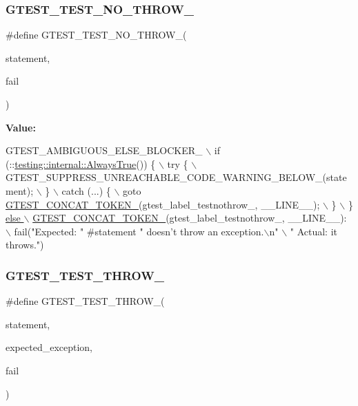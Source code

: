 \subsubsection{\texorpdfstring{G\+T\+E\+S\+T\+\_\+\+T\+E\+S\+T\+\_\+\+N\+O\+\_\+\+T\+H\+R\+O\+W\+\_\+}{GTEST\_TEST\_NO\_THROW\_}}
{\footnotesize\ttfamily \#define G\+T\+E\+S\+T\+\_\+\+T\+E\+S\+T\+\_\+\+N\+O\+\_\+\+T\+H\+R\+O\+W\+\_\+(\begin{DoxyParamCaption}\item[{}]{statement,  }\item[{}]{fail }\end{DoxyParamCaption})}

{\bfseries Value\+:}
\begin{DoxyCode}
GTEST\_AMBIGUOUS\_ELSE\_BLOCKER\_ \(\backslash\)
  if (::\hyperlink{namespacetesting_1_1internal_a4d46f09c3bfe68700b7f728d2cc3782f}{testing::internal::AlwaysTrue}()) \{ \(\backslash\)
    try \{ \(\backslash\)
      GTEST\_SUPPRESS\_UNREACHABLE\_CODE\_WARNING\_BELOW\_(statement); \(\backslash\)
    \} \(\backslash\)
    catch (...) \{ \(\backslash\)
      goto \hyperlink{gtest-internal_8h_ae3c336cbe1ae2bd1b1d019333e4428a0}{GTEST\_CONCAT\_TOKEN\_}(gtest\_label\_testnothrow\_, \_\_LINE\_\_); \(\backslash\)
    \} \(\backslash\)
  \} \hyperlink{gtest-internal_8h_ae3c336cbe1ae2bd1b1d019333e4428a0}{else \(\backslash\)}
\hyperlink{gtest-internal_8h_ae3c336cbe1ae2bd1b1d019333e4428a0}{    GTEST\_CONCAT\_TOKEN\_}(gtest\_label\_testnothrow\_, \_\_LINE\_\_): \(\backslash\)
      fail(\textcolor{stringliteral}{"Expected: "} #statement \textcolor{stringliteral}{" doesn't throw an exception.\(\backslash\)n"} \(\backslash\)
           \textcolor{stringliteral}{"  Actual: it throws."})
\end{DoxyCode}
\mbox{\label{gtest-internal_8h_a3f71db93eaf30b0cfca9612b9ac32106}} 
\subsubsection{\texorpdfstring{G\+T\+E\+S\+T\+\_\+\+T\+E\+S\+T\+\_\+\+T\+H\+R\+O\+W\+\_\+}{GTEST\_TEST\_THROW\_}}
{\footnotesize\ttfamily \#define G\+T\+E\+S\+T\+\_\+\+T\+E\+S\+T\+\_\+\+T\+H\+R\+O\+W\+\_\+(\begin{DoxyParamCaption}\item[{}]{statement,  }\item[{}]{expected\+\_\+exception,  }\item[{}]{fail }\end{DoxyParamCaption})}

